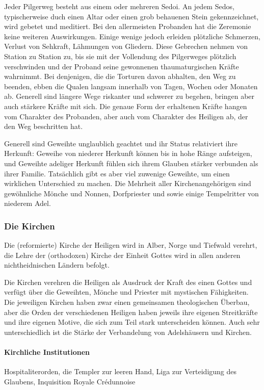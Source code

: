 \documentclass[10pt,twoside,twocolumn,openany]{book}
\begin{document}
	Jeder Pilgerweg besteht aus einem oder mehreren Sedoi. An jedem Sedos, typischerweise duch einen Altar oder einen grob behauenen Stein gekennzeichnet, wird gebetet und meditiert. Bei den allermeisten Probanden hat die Zeremonie keine weiteren Auswirkungen. Einige wenige jedoch erleiden plötzliche Schmerzen, Verlust von Sehkraft, Lähmungen von Gliedern. Diese Gebrechen nehmen von Station zu Station zu, bis sie mit der Vollendung des Pilgerweges plötzlich verschwinden und der Proband seine gewonnenen thaumaturgischen Kräfte wahrnimmt. Bei denjenigen, die die Torturen davon abhalten, den Weg zu beenden, ebben die Qualen langsam innerhalb von Tagen, Wochen oder Monaten ab. Generell sind längere Wege riskanter und schwerer zu begehen, bringen aber auch stärkere Kräfte mit sich. Die genaue Form der erhaltenen Kräfte hangen vom Charakter des Probanden, aber auch vom Charakter des Heiligen ab, der den Weg beschritten hat.
	
	Generell sind Geweihte unglaublich geachtet und ihr Status relativiert ihre Herkunft: Geweihe von niederer Herkunft können bis in hohe Ränge aufsteigen, und Geweihte adeliger Herkunft fühlen sich ihrem Glauben stärker verbunden als ihrer Familie. Tatsächlich gibt es aber viel zuwenige Geweihte, um einen wirklichen Unterschied zu machen. Die Mehrheit aller Kirchenangehörigen sind gewöhnliche Mönche und Nonnen, Dorfpriester und sowie einige Tempelritter von niederem Adel.
	
	\subsubsection{Die Kirchen}
	Die (reformierte) Kirche der Heiligen wird in Alber, Norge und Tiefwald verehrt, die Lehre der (orthodoxen) Kirche der Einheit Gottes wird in allen anderen nichtheidnischen Ländern befolgt.
	
	Die Kirchen verehren die Heiligen als Ausdruck der Kraft des einen Gottes und verfügt über die Geweihten, Mönche und Priester mit mystischen Fähigkeiten. Die jeweiligen Kirchen haben zwar einen gemeinsamen theologischen Überbau, aber die Orden der verschiedenen Heiligen haben jeweils ihre eigenen Streitkräfte und ihre eigenen Motive, die sich zum Teil stark unterscheiden können. Auch sehr unterschiedlich ist die Stärke der Verbandelung von Adelshäusern und Kirchen.
	\paragraph{Kirchliche Institutionen} Hospitaliterorden, die Templer zur leeren Hand, Liga zur Verteidigung des Glaubens, Inquisition Royale Crédunnoise
	
\end{document}

